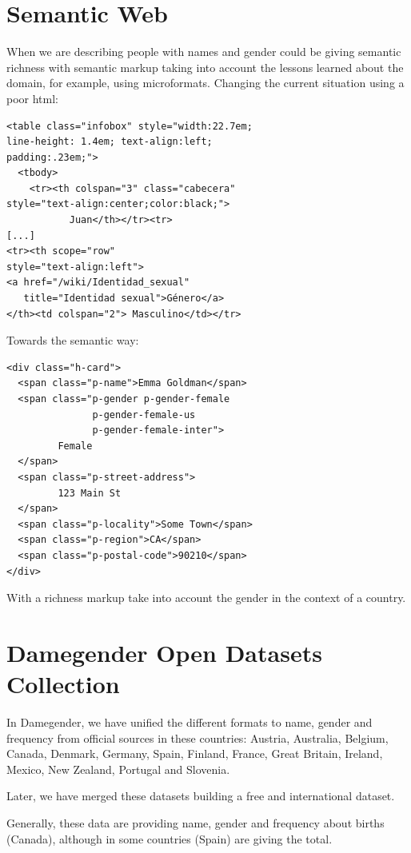 \documentclass[a4paper]{article}
\begin{document}
\section{Semantic Web}
\label{sec:semantic}

When we are describing people with names and gender could be giving
semantic richness with semantic markup taking into account the lessons
learned about the domain, for example, using microformats. Changing the
current situation using a poor html:

\begin{verbatim}
<table class="infobox" style="width:22.7em; 
line-height: 1.4em; text-align:left; 
padding:.23em;">
  <tbody>
    <tr><th colspan="3" class="cabecera"
style="text-align:center;color:black;">
           Juan</th></tr><tr>
[...]
<tr><th scope="row"
style="text-align:left">
<a href="/wiki/Identidad_sexual" 
   title="Identidad sexual">Género</a>
</th><td colspan="2"> Masculino</td></tr>
\end{verbatim}

Towards the semantic way:

\begin{verbatim}
<div class="h-card">
  <span class="p-name">Emma Goldman</span>
  <span class="p-gender p-gender-female 
               p-gender-female-us 
               p-gender-female-inter">
         Female
  </span>      
  <span class="p-street-address">
         123 Main St
  </span>
  <span class="p-locality">Some Town</span>
  <span class="p-region">CA</span>
  <span class="p-postal-code">90210</span>
</div>
\end{verbatim}

With a richness markup take into account the gender in the context of
a country.

\section{Damegender Open Datasets Collection}
\label{sec:damegender}

In Damegender, we have unified the different formats to name, gender
and frequency from official sources in these countries: Austria,
Australia, Belgium, Canada, Denmark, Germany, Spain, Finland, France,
Great Britain, Ireland, Mexico, New Zealand, Portugal and Slovenia.

Later, we have merged these datasets building a free and international
dataset.

Generally, these data are providing name, gender and frequency about
births (Canada), although in some countries (Spain) are giving the
total.
\end{document}
